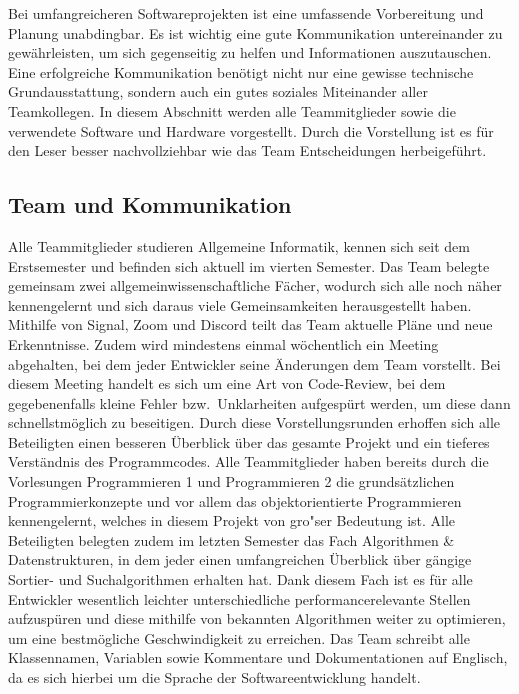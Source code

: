 Bei umfangreicheren Softwareprojekten ist eine umfassende Vorbereitung und Planung unabdingbar.
Es ist wichtig eine gute Kommunikation untereinander zu gew\"ahrleisten, um sich gegenseitig zu helfen und Informationen auszutauschen.
Eine erfolgreiche Kommunikation ben\"otigt nicht nur eine gewisse technische Grundausstattung, sondern auch ein gutes soziales Miteinander aller Teamkollegen.
In diesem Abschnitt werden alle Teammitglieder sowie die verwendete Software und Hardware vorgestellt.
Durch die Vorstellung ist es f\"ur den Leser besser nachvollziehbar wie das Team Entscheidungen herbeigef\"uhrt.

\subsection{Team und Kommunikation}\label{subsec:team-und-kommunikation}
Alle Teammitglieder studieren Allgemeine Informatik, kennen sich seit dem Erstsemester und befinden sich aktuell im vierten Semester.
Das Team belegte gemeinsam zwei allgemeinwissenschaftliche F\"acher, wodurch sich alle noch n\"aher kennengelernt und sich daraus viele Gemeinsamkeiten herausgestellt haben.
Mithilfe von Signal, Zoom und Discord teilt das Team aktuelle Pl\"ane und neue Erkenntnisse.
Zudem wird mindestens einmal w\"ochentlich ein Meeting abgehalten, bei dem jeder Entwickler seine \"Anderungen dem Team vorstellt.
Bei diesem Meeting handelt es sich um eine Art von Code-Review, bei dem gegebenenfalls kleine Fehler bzw.\ Unklarheiten aufgesp\"urt werden, um diese dann schnellstm\"oglich zu beseitigen.
Durch diese Vorstellungsrunden erhoffen sich alle Beteiligten einen besseren \"Uberblick \"uber das gesamte Projekt und ein tieferes Verst\"andnis des Programmcodes.
Alle Teammitglieder haben bereits durch die Vorlesungen Programmieren 1 und Programmieren 2 die grunds\"atzlichen Programmierkonzepte und vor allem das objektorientierte Programmieren kennengelernt, welches in diesem Projekt von gro"ser Bedeutung ist.
Alle Beteiligten belegten zudem im letzten Semester das Fach Algorithmen \& Datenstrukturen, in dem jeder einen umfangreichen \"Uberblick \"uber g\"angige Sortier- und Suchalgorithmen erhalten hat.
Dank diesem Fach ist es f\"ur alle Entwickler wesentlich leichter unterschiedliche performancerelevante Stellen aufzusp\"uren und diese mithilfe von bekannten Algorithmen weiter zu optimieren, um eine bestm\"ogliche Geschwindigkeit zu erreichen.
Das Team schreibt alle Klassennamen, Variablen sowie Kommentare und Dokumentationen auf Englisch, da es sich hierbei um die Sprache der Softwareentwicklung handelt.

